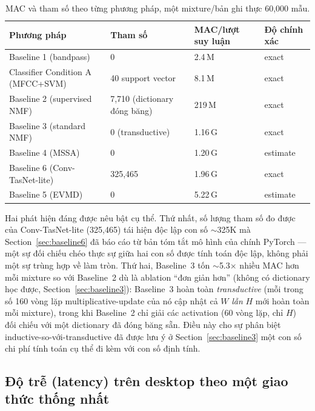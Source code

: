 \documentclass[11pt]{article}
\begin{document}
\begin{table}[H]
\centering
\caption{MAC và tham số theo từng phương pháp, một mixture/bản ghi thực 60,000 mẫu.}
\label{tab:macs}
\begin{tabular}{@{}llll@{}}
\toprule
Phương pháp & Tham số & MAC/lượt suy luận & Độ chính xác \\
\midrule
Baseline 1 (bandpass) & 0 & 2.4\,M & exact \\
Classifier Condition A (MFCC+SVM) & 40 support vector & 8.1\,M & exact \\
Baseline 2 (supervised NMF) & 7{,}710 (dictionary đóng băng) & 219\,M & exact \\
Baseline 3 (standard NMF) & 0 (transductive) & 1.16\,G & exact \\
Baseline 4 (MSSA) & 0 & 1.20\,G & estimate \\
Baseline 6 (Conv-TasNet-lite) & 325{,}465 & 1.96\,G & exact \\
Baseline 5 (EVMD) & 0 & 5.22\,G & estimate \\
\bottomrule
\end{tabular}
\end{table}

Hai phát hiện đáng được nêu bật cụ thể. Thứ nhất, số lượng tham số đo
được của Conv-TasNet-lite (325{,}465) tái hiện độc lập con số $\sim$325K
mà Section~\ref{sec:baseline6} đã báo cáo từ bản tóm tắt mô hình của
chính PyTorch --- một sự đối chiếu chéo thực sự giữa hai con số được
tính toán độc lập, không phải một sự trùng hợp về làm tròn. Thứ hai,
Baseline~3 tốn $\sim$5.3$\times$ nhiều MAC hơn mỗi mixture so với
Baseline~2 dù là ablation ``đơn giản hơn'' (không có dictionary học
được, Section~\ref{sec:baseline3}): Baseline~3 hoàn toàn
\emph{transductive} (mỗi trong số 160 vòng lặp multiplicative-update của
nó cập nhật cả $W$ \emph{lẫn} $H$ mới hoàn toàn mỗi mixture), trong khi
Baseline~2 chỉ giải các activation (60 vòng lặp, chỉ $H$) đối chiếu với
một dictionary đã đóng băng sẵn. Điều này cho sự phân biệt
inductive-so-với-transductive đã được lưu ý ở Section~\ref{sec:baseline3}
một con số chi phí tính toán cụ thể đi kèm với con số định tính.

\subsection{Độ trễ (latency) trên desktop theo một giao thức thống nhất}
\label{sec:latency}
\end{document}
